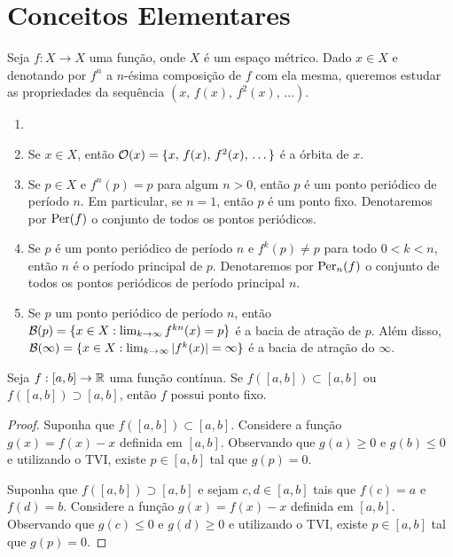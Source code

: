 \section{Conceitos Elementares}

Seja $f: X \to X$ uma função, onde $X$ é um espaço métrico.
Dado $x \in X$ e denotando por $f^n$ a $n$-ésima composição de $f$ com ela mesma, queremos estudar as propriedades da sequência $(x, \, f(x), \, f^2(x), \, \dots)$.

\begin{definition}
\begin{enumerate}[label = \alph*.]
\item[]

\item Se $x \in X$, então $\mathcal{O}(x) = \{ x, \, f(x), \, f^2(x), \, \dots \}$ é a órbita de $x$.

\item Se $p \in X$ e $f^n(p) = p$ para algum $n > 0$, então $p$ é um ponto periódico de período $n$. Em particular, se $n = 1$, então $p$ é um ponto fixo. Denotaremos por $\operatorname{Per}(f)$ o conjunto de todos os pontos periódicos.

\item Se $p$ é um ponto periódico de período $n$ e $f^k(p) \neq p$ para todo $0 < k < n$, então $n$ é o período principal de $p$. Denotaremos por $\operatorname{Per}_n(f)$ o conjunto de todos os pontos periódicos de período principal $n$.

\item Se $p$ um ponto periódico de período $n$, então $\mathcal{B}(p) = \{ x \in  X: \lim_{k \to \infty} f^{kn}(x) = p \}$ é a bacia de atração de $p$. Além disso, $\mathcal{B}(\infty) = \{ x \in  X: \lim_{k \to \infty} |f^k(x)| = \infty \}$ é a bacia de atração do $\infty$.
\end{enumerate}
\end{definition}

\begin{proposition} \label{prop 1-1}
Seja $f: [a, b] \to \mathbb{R}$ uma função contínua. Se $f([a, b]) \subset [a, b]$ ou $f([a, b]) \supset [a, b]$, então $f$ possui ponto fixo.
\end{proposition}

\begin{proof}
Suponha que $f([a, b]) \subset [a, b]$. Considere a função $g(x) = f(x) - x$ definida em $[a, b]$. Observando que $g(a) \geq 0$ e $g(b) \leq 0$ e utilizando o TVI, existe $p \in [a, b]$ tal que $g(p) = 0$.

Suponha que $f([a, b]) \supset [a, b]$ e sejam $c, d \in [a, b]$ tais que $f(c) = a$ e $f(d) = b$. Considere a função $g(x) = f(x) - x$ definida em $[a, b]$. Observando que $g(c) \leq 0$ e $g(d) \geq 0$ e utilizando o TVI, existe $p \in [a, b]$ tal que $g(p) = 0$.
\end{proof}

